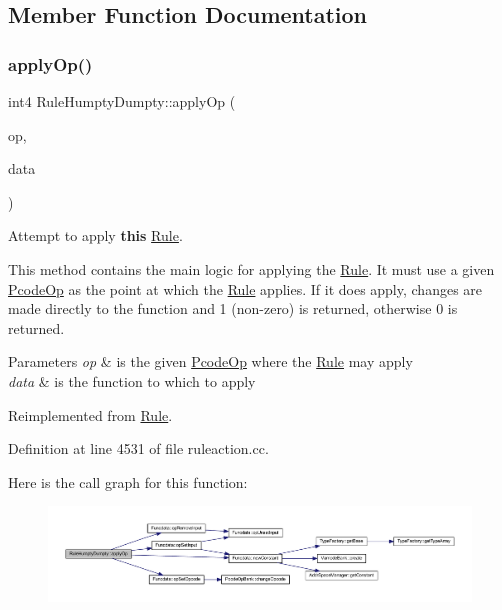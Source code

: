 \subsection{Member Function Documentation}
\mbox{\label{class_rule_humpty_dumpty_a49a97daa382a5e01626144d914438301}} 
\subsubsection{\texorpdfstring{applyOp()}{applyOp()}}
{\footnotesize\ttfamily int4 Rule\+Humpty\+Dumpty\+::apply\+Op (\begin{DoxyParamCaption}\item[{\mbox{\hyperlink{class_pcode_op}{Pcode\+Op}} $\ast$}]{op,  }\item[{\mbox{\hyperlink{class_funcdata}{Funcdata}} \&}]{data }\end{DoxyParamCaption})\hspace{0.3cm}{\ttfamily [virtual]}}



Attempt to apply {\bfseries{this}} \mbox{\hyperlink{class_rule}{Rule}}. 

This method contains the main logic for applying the \mbox{\hyperlink{class_rule}{Rule}}. It must use a given \mbox{\hyperlink{class_pcode_op}{Pcode\+Op}} as the point at which the \mbox{\hyperlink{class_rule}{Rule}} applies. If it does apply, changes are made directly to the function and 1 (non-\/zero) is returned, otherwise 0 is returned. 
\begin{DoxyParams}{Parameters}
{\em op} & is the given \mbox{\hyperlink{class_pcode_op}{Pcode\+Op}} where the \mbox{\hyperlink{class_rule}{Rule}} may apply \\
\hline
{\em data} & is the function to which to apply \\
\hline
\end{DoxyParams}


Reimplemented from \mbox{\hyperlink{class_rule_a4e3e61f066670175009f60fb9dc60848}{Rule}}.



Definition at line 4531 of file ruleaction.\+cc.

Here is the call graph for this function\+:
\nopagebreak
\begin{figure}[H]
\begin{center}
\leavevmode
\includegraphics[width=350pt]{class_rule_humpty_dumpty_a49a97daa382a5e01626144d914438301_cgraph}
\end{center}
\end{figure}
\mbox{\label{class_rule_humpty_dumpty_a7fe5c55ca82d167ba7da46f2081e0c56}} 

